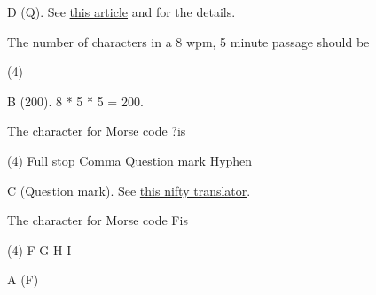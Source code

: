 \documentclass[a4paper]{article}
\begin{document}
\begin{solution}
	D (Q). See \href{https://experiments.withgoogle.com/collection/morse}{this article} and for the details.
\end{solution}

\vspace{5mm}



\begin{question}The number of characters in a 8 wpm, 5 minute passage should be \spaces
	\begin{tasks}(4)
	\end{tasks}
\end{question}

\begin{solution}
	B (200). 8 * 5 * 5 = 200.
\end{solution}



\vspace{5mm}
\begin{question}The character for Morse code {\Large\morse ?}\hspace{-0.25em}is \spaces
	\begin{tasks}(4)
		\task Full stop
		\task Comma
		\task Question mark
		\task Hyphen
	\end{tasks}
\end{question}

\begin{solution}
	C (Question mark). See \href{https://morsecode.scphillips.com/translator.html}{this nifty translator}.
\end{solution}

\vspace{5mm}



\begin{question}The character for Morse code {\Large\morse F}\hspace{-0.25em}is \spaces
	\begin{tasks}(4)
		\task F
		\task G
		\task H
		\task I
	\end{tasks}
\end{question}

\begin{solution}
	A (F)
\end{solution}

\vspace{5mm}
\end{document}
